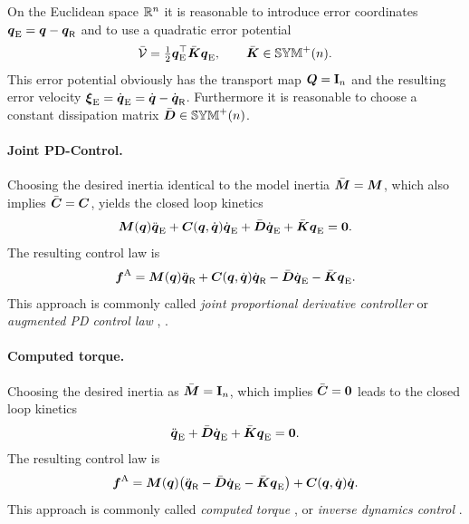 On the Euclidean space $\RealNum^\dimConfigSpace$ it is reasonable to introduce error coordinates $\genCoordE = \genCoord - \genCoordR$ and to use a quadratic error potential
\begin{align}\label{eq:EuclideanMetricPotential}
 \potentialEnergyC = \tfrac{1}{2} \genCoordE^\top \sysStiffMatC \genCoordE, \qquad \sysStiffMatC \in \SymMatP(\dimConfigSpace).
\end{align}
This error potential obviously has the transport map $\sysTransportMap = \idMat[\dimConfigSpace]$ and the resulting error velocity $\sysVelE = \genCoordEd = \genCoordd - \genCoordRd$.
Furthermore it is reasonable to choose a constant dissipation matrix $\sysDissMatC \in \SymMatP(\dimConfigSpace)$.

\paragraph{Joint PD-Control.}
Choosing the desired inertia identical to the model inertia $\sysInertiaMatC = \sysInertiaMat$, which also implies $\ConnMatC = \ConnMat$, yields the closed loop kinetics
\begin{align}
 \sysInertiaMat(\genCoord) \genCoordEdd + \ConnMat(\genCoord, \genCoordd) \genCoordEd + \sysDissMatC \genCoordEd + \sysStiffMatC \genCoordE = \tuple{0}.
\end{align}
The resulting control law is
\begin{align}
 \genForceImpressed = \sysInertiaMat(\genCoord) \genCoordRdd + \ConnMat(\genCoord, \genCoordd) \genCoordRd - \sysDissMatC \genCoordEd - \sysStiffMatC \genCoordE.
\end{align} 
This approach is commonly called \textit{joint proportional derivative controller} \cite[sec.\,9.1.1]{Slotine:AppliedNonlinearControl} or \textit{augmented PD control law} \cite[sec.\,4.5.3]{Murray:Robotic}, \cite[sec.\,8.2]{Spong:RobotModelingAndControl}.

\paragraph{Computed torque.}
Choosing the desired inertia as $\sysInertiaMatC = \idMat[{\dimConfigSpace}]$, which implies $\ConnMatC = \mat{0}$ leads to the closed loop kinetics
\begin{align}
 \genCoordEdd + \sysDissMatC \genCoordEd + \sysStiffMatC \genCoordE = \tuple{0}.
\end{align}
The resulting control law is
\begin{align}
 \genForceImpressed = \sysInertiaMat(\genCoord) \big( \genCoordRdd - \sysDissMatC \genCoordEd - \sysStiffMatC \genCoordE \big) + \ConnMat(\genCoord, \genCoordd) \genCoordd.
\end{align}
This approach is commonly called \textit{computed torque} \cite[sec.\,4.5.2]{Murray:Robotic}, \cite[sec.\,9.1.2]{Slotine:AppliedNonlinearControl} or \textit{inverse dynamics control} \cite[sec.\,8.3]{Spong:RobotModelingAndControl}.

